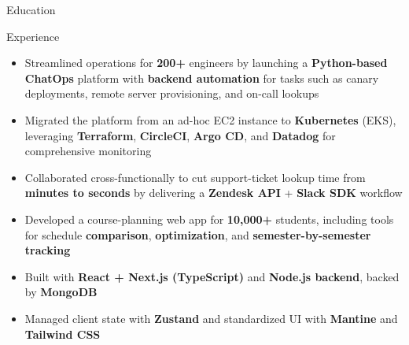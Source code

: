 \documentclass{resume}
\begin{document}
\introduction[
    fullname={Declan Blanchard},
    email={declanblanc@gmail.com},
    linkedin={linkedin.com/in/declanblanc},
    github={github.com/declanblanc}
]

\begin{educationSection}{Education}
    \educationItem[
        university={New Jersey Institute of Technology},
        graduation={May 2026},
        grade={\textbf{3.8 GPA}},
        program={Bachelor's, Computer Science}
    ]
\end{educationSection}

\begin{experienceSection}{Experience}


    \experienceItem[
        company={Patreon},
        location={New York, NY},
        position={Software Engineer Intern},
        duration={May 2025 - August 2025}
    ]
    \begin{itemize}[itemsep=-6pt, leftmargin=2em, rightmargin=0.8em, before=\raggedright, after=\normalfont]
        \item Streamlined operations for \textbf{200+} engineers by launching a \textbf{Python-based ChatOps} platform with \textbf{backend automation} for tasks such as canary deployments, remote server provisioning, and on-call lookups
       \item Migrated the platform from an ad-hoc EC2 instance to \textbf{Kubernetes} (EKS), leveraging \textbf{Terraform}, \textbf{CircleCI}, \textbf{Argo CD}, and \textbf{Datadog} for comprehensive monitoring 
        \item Collaborated cross-functionally to cut support-ticket lookup time from \textbf{minutes to seconds} by delivering a \textbf{Zendesk API} + \textbf{Slack SDK} workflow
    \end{itemize}

    \experienceItem[
        company={New Jersey Institute of Technology},
        location={Newark, NJ},
        position={Full Stack Developer},
        duration={January 2025 - Present}
    ]
    \begin{itemize}[itemsep=-6pt, leftmargin=2em, rightmargin=0.8em, before=\raggedright, after=\normalfont]
        \item Developed a course-planning web app for \textbf{10,000+} students, including tools for schedule \textbf{comparison}, \textbf{optimization}, and \textbf{semester-by-semester tracking} 
        \item Built with \textbf{React + Next.js (TypeScript)} and \textbf{Node.js backend}, backed by \textbf{MongoDB}
        \item Managed client state with \textbf{Zustand} and standardized UI with \textbf{Mantine} and \textbf{Tailwind CSS}
    \end{itemize}



\end{experienceSection}
\end{document}

